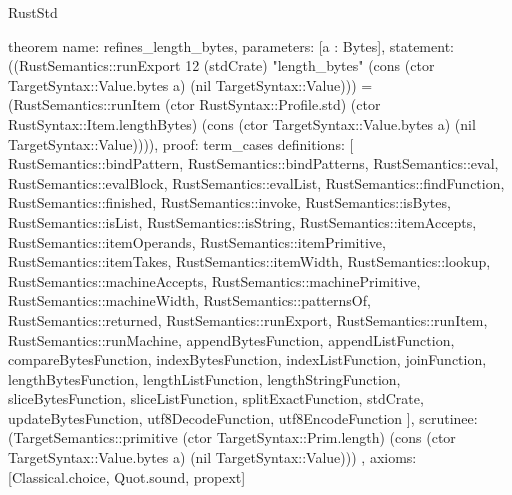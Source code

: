 \begin{lexlean}{RustStd}
\begin{semanticmodule}
theorem{
  name: refines_length_bytes,
  parameters: [a : Bytes],
  statement: ((RustSemantics::runExport 12 (stdCrate) "length_bytes" (cons (ctor TargetSyntax::Value.bytes a) (nil TargetSyntax::Value))) = (RustSemantics::runItem (ctor RustSyntax::Profile.std) (ctor RustSyntax::Item.lengthBytes) (cons (ctor TargetSyntax::Value.bytes a) (nil TargetSyntax::Value)))),
  proof: term_cases{
    definitions: [
      RustSemantics::bindPattern,
      RustSemantics::bindPatterns,
      RustSemantics::eval,
      RustSemantics::evalBlock,
      RustSemantics::evalList,
      RustSemantics::findFunction,
      RustSemantics::finished,
      RustSemantics::invoke,
      RustSemantics::isBytes,
      RustSemantics::isList,
      RustSemantics::isString,
      RustSemantics::itemAccepts,
      RustSemantics::itemOperands,
      RustSemantics::itemPrimitive,
      RustSemantics::itemTakes,
      RustSemantics::itemWidth,
      RustSemantics::lookup,
      RustSemantics::machineAccepts,
      RustSemantics::machinePrimitive,
      RustSemantics::machineWidth,
      RustSemantics::patternsOf,
      RustSemantics::returned,
      RustSemantics::runExport,
      RustSemantics::runItem,
      RustSemantics::runMachine,
      appendBytesFunction,
      appendListFunction,
      compareBytesFunction,
      indexBytesFunction,
      indexListFunction,
      joinFunction,
      lengthBytesFunction,
      lengthListFunction,
      lengthStringFunction,
      sliceBytesFunction,
      sliceListFunction,
      splitExactFunction,
      stdCrate,
      updateBytesFunction,
      utf8DecodeFunction,
      utf8EncodeFunction
    ],
    scrutinee: (TargetSemantics::primitive (ctor TargetSyntax::Prim.length) (cons (ctor TargetSyntax::Value.bytes a) (nil TargetSyntax::Value)))
  },
  axioms: [Classical.choice, Quot.sound, propext]
}


\end{semanticmodule}
\end{lexlean}
